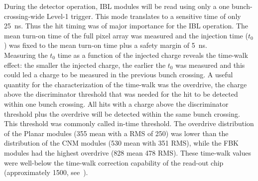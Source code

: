 During the detector operation, IBL modules will be read using only a one bunch-crossing-wide Level-1 trigger. This mode translates to a sensitive time of only \SI{25}{\nano\second}. Thus the hit timing was of major importance for the IBL operation.%
The mean turn-on time of the full pixel array was measured and the injection time ($t_0$) was fixed to the mean turn-on time plus a safety margin of \SI{5}{\nano\second}.\\
Measuring the $t_0$ time as a function of the injected charge reveals the time-walk effect: the smaller the injected charge, the earlier the $t_0$ was measured and this could led a charge to be measured in the previous bunch crossing.
A useful quantity for the characterization of the time-walk was the overdrive, the charge above the discriminator threshold that was needed for the hit to be detected within one bunch crossing. All hits with a charge above the discriminator threshold plus the overdrive will be detected within the same bunch crossing. This threshold was commonly called in-time threshold. 
The overdrive distribution of the Planar  modules (\SI{355}{\e} mean with a RMS of \SI{250}{\e}) was lower than the distribution of the CNM modules (\SI{530}{\e} mean with \SI{351}{\e} RMS), while the FBK modules had the highest overdrive (\SI{828}{\e} mean \SI{478}{\e} RMS). These time-walk values were well-below the time-walk correction capability of the read-out chip (approximately \SI{1500}{\e}, see~\cite{BackhausPhd}).\\
